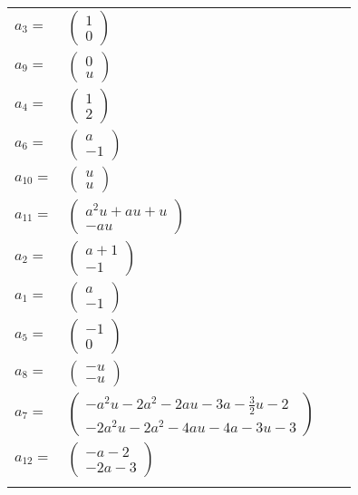 \documentclass[1p]{elsarticle_modified}
\theoremstyle{definition}
\begin{document}
\begin{tabular}{m{7pt} m{180pt} m{7pt} m{180pt} }
\flushright $a_{3}=$&$\begin{pmatrix}1\\0\end{pmatrix}$ \\
\flushright $a_{9}=$&$\begin{pmatrix}0\\u\end{pmatrix}$ \\
\flushright $a_{4}=$&$\begin{pmatrix}1\\2\end{pmatrix}$ \\
\flushright $a_{6}=$&$\begin{pmatrix}a\\-1\end{pmatrix}$ \\
\flushright $a_{10}=$&$\begin{pmatrix}u\\u\end{pmatrix}$ \\
\flushright $a_{11}=$&$\begin{pmatrix}a^2 u+a u+u\\- a u\end{pmatrix}$ \\
\flushright $a_{2}=$&$\begin{pmatrix}a+1\\-1\end{pmatrix}$ \\
\flushright $a_{1}=$&$\begin{pmatrix}a\\-1\end{pmatrix}$ \\
\flushright $a_{5}=$&$\begin{pmatrix}-1\\0\end{pmatrix}$ \\
\flushright $a_{8}=$&$\begin{pmatrix}- u\\- u\end{pmatrix}$ \\
\flushright $a_{7}=$&$\begin{pmatrix}- a^2 u-2 a^2-2 a u-3 a-\frac{3}{2} u-2\\-2 a^2 u-2 a^2-4 a u-4 a-3 u-3\end{pmatrix}$ \\
\flushright $a_{12}=$&$\begin{pmatrix}- a-2\\-2 a-3\end{pmatrix}$\\&\end{tabular}
\end{document}

